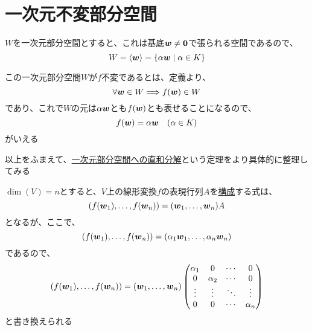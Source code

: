 \documentclass[../../../topic_linear-algebra]{subfiles}
\begin{document}
\sectionline
\section{一次元不変部分空間}

$W$を一次元部分空間とすると、これは基底$\vb*{w} \neq \vb*{0}$で張られる空間であるので、
\begin{equation*}
  W = \langle \vb*{w} \rangle = \{ \alpha \vb*{w} \mid \alpha \in K \}
\end{equation*}

この一次元部分空間$W$が$f$不変であるとは、定義より、
\begin{equation*}
  \forall \vb*{w} \in W \Longrightarrow f(\vb*{w}) \in W
\end{equation*}
であり、これで$W$の元は$\alpha \vb*{w}$とも$f(\vb*{w})$とも表せることになるので、
\begin{equation*}
  f(\vb*{w}) = \alpha \vb*{w} \quad (\alpha \in K)
\end{equation*}
がいえる

\br

以上をふまえて、\hyperref[thm:diagonalizable-by-1d-invariant-sum]{一次元部分空間への直和分解}という定理をより具体的に整理してみる

\br

$\dim(V) = n$とすると、$V$上の線形変換$f$の表現行列$A$を\hyperref[sec:construction-of-matrix-rep]{構成}する式は、
\begin{equation*}
  (f(\vb*{w}_1), \ldots, f(\vb*{w}_n)) = (\vb*{w}_1, \ldots, \vb*{w}_n) A
\end{equation*}
となるが、ここで、
\begin{equation*}
  (f(\vb*{w}_1), \ldots, f(\vb*{w}_n)) = (\alpha_1 \vb*{w}_1, \ldots, \alpha_n \vb*{w}_n)
\end{equation*}
であるので、
\begin{equation*}
  (f(\vb*{w}_1), \ldots, f(\vb*{w}_n)) = (\vb*{w}_1, \ldots, \vb*{w}_n) \begin{pmatrix}
    \alpha_1 & 0        & \cdots & 0        \\
    0        & \alpha_2 & \cdots & 0        \\
    \vdots   & \vdots   & \ddots & \vdots   \\
    0        & 0        & \cdots & \alpha_n
  \end{pmatrix}
\end{equation*}
と書き換えられる

\br
\end{document}
